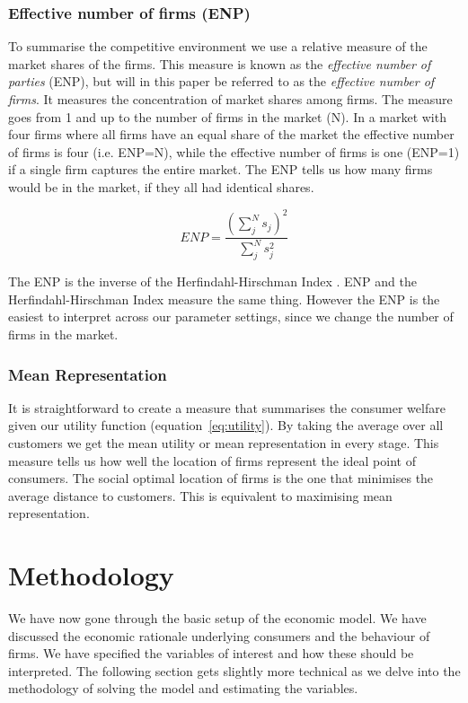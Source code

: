 \documentclass[preprint, 12pt]{elsarticle}
\begin{document}
\subsubsection{Effective number of firms (ENP)}
To summarise the competitive environment we use a relative measure of the market shares of the firms. This measure is known as the \emph{effective number of parties} (ENP), but will in this paper be referred to as the \emph{effective number of firms}. It measures the concentration of market shares among firms. The measure goes from 1 and up to the number of firms in the market (N). In a market with four firms where all firms have an equal share of the market the effective number of firms is four (i.e. ENP=N), while the effective number of firms is one (ENP=1) if a single firm captures the entire market. The ENP tells us how many firms would be in the market, if they all had identical shares.

\begin{equation}
ENP = \frac{{\left( \sum\limits_j^N s_j \right)^2}}{{\sum\limits_j^N s_j^2 }}
\label{eq:enp}
\end{equation}

The ENP is the inverse of the Herfindahl-Hirschman Index \citep[p.~4]{Laakso_Taagepera_1979}. ENP and the Herfindahl-Hirschman Index measure the same thing. However the ENP is the easiest to interpret across our parameter settings, since we change the number of firms in the market.

\subsubsection{Mean Representation}
It is straightforward to create a measure that summarises the consumer welfare given our utility function (equation~\ref{eq:utility}). By taking the average over all customers we get the mean utility or mean representation in every stage. This measure tells us how well the location of firms represent the ideal point of consumers. The social optimal location of firms is the one that minimises the average distance to customers. This is equivalent to maximising mean representation.


\section{Methodology} %

We have now gone through the basic setup of the economic model. We have discussed the economic rationale underlying consumers and the behaviour of firms. We have specified the variables of interest and how these should be interpreted. The following section gets slightly more technical as we delve into the methodology of solving the model and estimating the variables.
\end{document}
